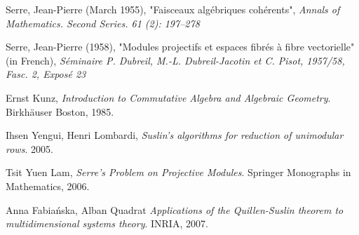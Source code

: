 \begin{thebibliography}{9}


Serre, Jean-Pierre (March 1955), "Faisceaux algébriques cohérents",
\emph{Annals of Mathematics. Second Series. 61 (2): 197–278}

 Serre, Jean-Pierre (1958), "Modules projectifs et espaces fibrés à fibre vectorielle" (in French),
 \emph{Séminaire P. Dubreil, M.-L. Dubreil-Jacotin et C. Pisot, 1957/58, Fasc. 2, Exposé 23}

  Ernst Kunz,
  \emph{Introduction to Commutative Algebra and Algebraic Geometry}.
  Birkhäuser Boston,
  1985.

  Ihsen Yengui, Henri Lombardi,
  \emph{Suslin's algorithms for reduction of unimodular rows}.
  2005.

  Tsit Yuen Lam,
  \emph{Serre's Problem on Projective Modules}.
  Springer Monographs in Mathematics,
  2006.

  Anna Fabia\'{n}ska, Alban Quadrat
  \emph{Applications of the Quillen-Suslin theorem to multidimensional systems theory}.
  INRIA,
  2007.

\end{thebibliography}
